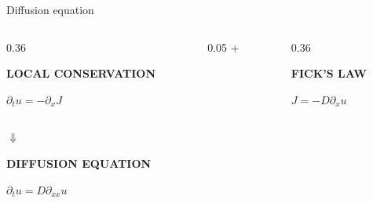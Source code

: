 \begin{frame}{Diffusion equation}

  \vspace{0.02cm}

  \begin{columns}[c,onlytextwidth]
    \begin{column}{0.36\textwidth}
      \centering
      {\color{HydraGold}\bfseries\fontsize{7.6}{9}\selectfont
        LOCAL CONSERVATION\par}
      \vspace{0.04cm}
      {\color{HydraWhite}\fontsize{11.5}{14}\selectfont
        $\partial_tu=-\partial_xJ$
      \par}
    \end{column}

    \begin{column}{0.05\textwidth}
      \centering
      {\color{HydraCyan}\fontsize{15}{15}\selectfont $+$}
    \end{column}

    \begin{column}{0.36\textwidth}
      \centering
      {\color{HydraGold}\bfseries\fontsize{7.6}{9}\selectfont
        FICK'S LAW\par}
      \vspace{0.04cm}
      {\color{HydraWhite}\fontsize{11.5}{14}\selectfont
        $J=-D\partial_xu$
      \par}
    \end{column}
  \end{columns}

  \vspace{0.06cm}

  \begin{center}
    {\color{HydraCyan}\fontsize{16}{16}\selectfont $\Downarrow$\par}

    \vspace{0.66cm}

    {\color{HydraGold}\bfseries\fontsize{8.4}{10}\selectfont
      DIFFUSION EQUATION\par}

    \vspace{0.12cm}

    {\color{HydraWhite}\bfseries\fontsize{20}{24}\selectfont
      $\boxed{\partial_tu=D\partial_{xx}u}$
    \par}
  \end{center}

\end{frame}


